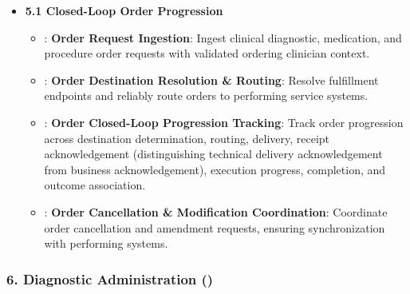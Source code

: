 \begin{itemize}

\item
\textbf{5.1 Closed-Loop Order Progression}


\begin{itemize}

\item
\texttt{}: \textbf{Order Request Ingestion}: Ingest clinical diagnostic, medication, and procedure order requests with validated ordering clinician context.



\item
\texttt{}: \textbf{Order Destination Resolution \& Routing}: Resolve fulfillment endpoints and reliably route orders to performing service systems.



\item
\texttt{}: \textbf{Order Closed-Loop Progression Tracking}: Track order progression across destination determination, routing, delivery, receipt acknowledgement (distinguishing technical delivery acknowledgement from business acknowledgement), execution progress, completion, and outcome association.



\item
\texttt{}: \textbf{Order Cancellation \& Modification Coordination}: Coordinate order cancellation and amendment requests, ensuring synchronization with performing systems.



\end{itemize}


\end{itemize}
\label{rad:enabling:308}
\subsubsection*{6. Diagnostic Administration (\texttt{})}
\label{rad:enabling:309}

